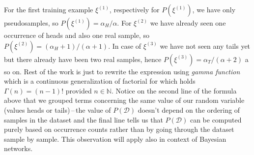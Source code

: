 \documentclass[english,cover]{fitthesis} %
\newcommand{\term}[1]{\emph{#1}}           %
\begin{document}
For the first training example $\xi^{(1)}$, respectively for $P(\xi^{(1)})$, we have only pseudosamples, so $P(\xi^{(1)}) = \alpha_H / \alpha$. For $\xi^{(2)}$ we have already seen one occurrence of heads and also one real sample, so $P(\xi^{(2)}) = (\alpha_H + 1) / (\alpha + 1)$. In case of $\xi^{(3)}$ we have not seen any tails yet but there already have been two real samples, hence $P(\xi^{(3)}) = \alpha_T / (\alpha + 2)$ a so on. Rest of the work is just to rewrite the expression using \term{gamma function} which is a continuous generalization of factorial for which holds $\Gamma(n) = (n-1)!$ provided $n \in \mathbb{N}$. Notice on the second line of the formula above that we grouped terms concerning the same value of our random variable (values heads or tails)\,--\,the value of $P(\mathcal{D})$ doesn't depend on the ordering of samples in the dataset and the final line tells us that $P(\mathcal{D})$ can be computed purely based on occurrence counts rather than by going through the dataset sample by sample. This observation will apply also in context of Bayesian networks.
\end{document}

